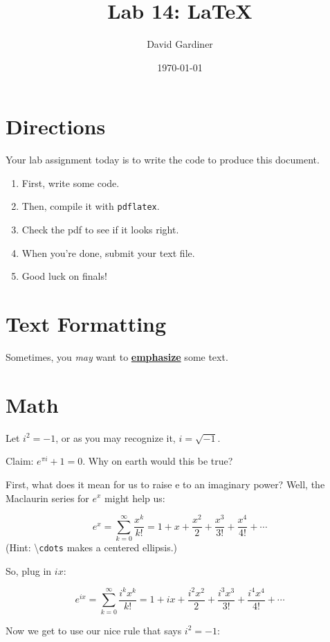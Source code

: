 \documentclass{article}
\title{Lab 14: \LaTeX{}}
\author{David Gardiner}
\date{\today}
\begin{document}
\maketitle

\section{Directions}
Your lab assignment today is to write the code to produce this document.
\begin{enumerate}
	\item First, write some code.
	\item Then, compile it with \texttt{pdflatex}.
	\item Check the pdf to see if it looks right.
	\item When you're done, submit your text file.
	\item Good luck on finals!
\end{enumerate}

\section{Text Formatting}
Sometimes, you \textit{may} want to \textbf{\underline{emphasize}} some text.

\section{Math}
Let $i^2 = -1$, or as you may recognize it, $i = \sqrt{-1}$.

Claim: $e^{\pi{i}} + 1 = 0$. Why on earth would this be true?

First, what does it mean for us to raise e to an imaginary power? Well, the 
Maclaurin series for $e^x$ might help us:

\begin{equation}
e^x = \sum_{k=0}^{\infty} \frac{x^k}{k!} = 1 + x + \frac{x^2}{2} +
\frac{x^3}{3!} + \frac{x^4}{4!} + \cdots
\end{equation}
(Hint: \textbackslash\texttt{cdots} makes a centered ellipsis.)

So, plug in $ix$:

\begin{equation}
e^{ix} = \sum_{k=0}^{\infty} \frac{i^kx^k}{k!} = 1 + ix + \frac{i^2x^2}{2} + 
\frac{i^3x^3}{3!} + \frac{i^4x^4}{4!} + \cdots
\end{equation}

\newpage 
Now we get to use our nice rule that says $i^2 = -1$:
\end{document}
